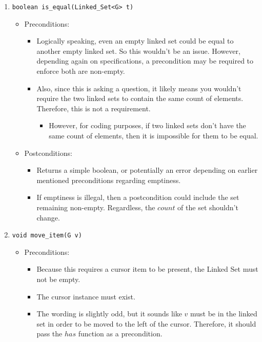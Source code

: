 \documentclass{article}
\begin{document}
\begin{enumerate}
\begin{itemize}
    \end{itemize}
    \item \texttt{boolean is\_equal(Linked\_Set<G> t)}
    \begin{itemize}
        \item Preconditions:
        \begin{itemize}
            \item Logically speaking, even an empty linked set could be equal to another empty linked set. So this wouldn't be an issue. However, depending again on specifications, a precondition may be required to enforce both are non-empty.
            \item Also, since this is asking a question, it likely means you wouldn't require the two linked sets to contain the same count of elements. Therefore, this is not a requirement.
            \begin{itemize}
                \item However, for coding purposes, if two linked sets don't have the same count of elements, then it is impossible for them to be equal.
            \end{itemize}
        \end{itemize}
        \item Postconditions:
        \begin{itemize}
            \item Returns a simple boolean, or potentially an error depending on earlier mentioned preconditions regarding emptiness.
            \item If emptiness is illegal, then a postcondition could include the set remaining non-empty. Regardless, the $count$ of the set shouldn't change.
        \end{itemize}
    \end{itemize}
    \item \texttt{void move\_item(G v)}
    \begin{itemize}
        \item Preconditions:
        \begin{itemize}
            \item Because this requires a cursor item to be present, the Linked Set must not be empty.
            \item The cursor instance must exist.
            \item The wording is slightly odd, but it sounds like $v$ must be in the linked set in order to be moved to the left of the cursor. Therefore, it should pass the $has$ function as a precondition.

\end{itemize}
\end{itemize}
\end{enumerate}
\end{document}
